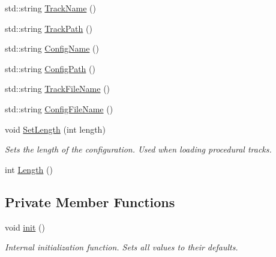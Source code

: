 \begin{DoxyCompactItemize}
\item 
std\-::string \hyperlink{classprocedural_1_1_p_track_load_state_a3705216d68ad30fef19a70a9d6bacefd}{Track\-Name} ()
\item 
std\-::string \hyperlink{classprocedural_1_1_p_track_load_state_a25e2b48f521cb7f2cf9b1548284f372e}{Track\-Path} ()
\item 
std\-::string \hyperlink{classprocedural_1_1_p_track_load_state_a21754746f81b678d785be4b58a416de0}{Config\-Name} ()
\item 
std\-::string \hyperlink{classprocedural_1_1_p_track_load_state_a1312122a2a0f851714fa1a3acf5cc324}{Config\-Path} ()
\item 
std\-::string \hyperlink{classprocedural_1_1_p_track_load_state_a646c33fd9d9d89b4760caa157980956d}{Track\-File\-Name} ()
\item 
std\-::string \hyperlink{classprocedural_1_1_p_track_load_state_a3bbb769a794f0f15b15888d28e2a8179}{Config\-File\-Name} ()
\item 
void \hyperlink{classprocedural_1_1_p_track_load_state_aa909d47596085c90af8e00fe9c706e14}{Set\-Length} (int length)
\begin{DoxyCompactList}\small\item\em Sets the length of the configuration. Used when loading procedural tracks. \end{DoxyCompactList}\item 
int \hyperlink{classprocedural_1_1_p_track_load_state_afcab5b48515ffb1ff7c1d05b0adecddb}{Length} ()
\end{DoxyCompactItemize}
\subsection*{Private Member Functions}
\begin{DoxyCompactItemize}
\item 
\hypertarget{classprocedural_1_1_p_track_load_state_ad57d310e90e9014e11e5c375305aa3e7}{void \hyperlink{classprocedural_1_1_p_track_load_state_ad57d310e90e9014e11e5c375305aa3e7}{init} ()}\label{classprocedural_1_1_p_track_load_state_ad57d310e90e9014e11e5c375305aa3e7}

\begin{DoxyCompactList}\small\item\em Internal initialization function. Sets all values to their defaults. \end{DoxyCompactList}\end{DoxyCompactItemize}

